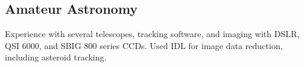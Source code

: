 \documentclass[letterpaper]{deedy-resume} %
\begin{document}
\begin{minipage}[t]{0.33\textwidth}
\subsection{Amateur Astronomy}
Experience with several telescopes, tracking software, and imaging with DSLR, QSI 6000, and SBIG 800 series CCDs. Used IDL for image data reduction, including asteroid tracking.
\sectionspace %


\end{minipage} %
\hfill
%
%
\end{document}
